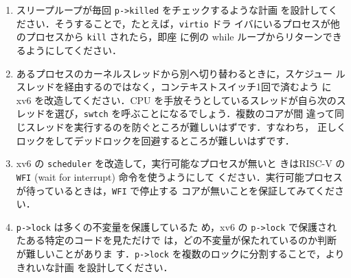 \begin{enumerate}
\item スリープループが毎回 \texttt{p->killed} をチェックするような計画
  を設計してください．そうすることで，たとえば，\texttt{virtio} ドラ
  イバにいるプロセスが他のプロセスから \texttt{kill} されたら，即座
  に例の while ループからリターンできるようにしてください．

\item あるプロセスのカーネルスレッドから別へ切り替わるときに，スケジュー
  ルスレッドを経由するのではなく，コンテキストスイッチ1回で済むよう
  に xv6 を改造してください．CPU を手放そうとしているスレッドが自ら次のス
  レッドを選び，\texttt{swtch} を呼ぶことになるでしょう．複数のコアが間
  違って同じスレッドを実行するのを防ぐところが難しいはずです．すなわち，
  正しくロックをしてデッドロックを回避するところが難しいはずです．

\item xv6 の \texttt{scheduler} を改造して，実行可能なプロセスが無いと
  きはRISC-V の \texttt{WFI} (wait for interrupt) 命令を使うようにして
  ください．実行可能プロセスが待っているときは，\texttt{WFI} で停止する
  コアが無いことを保証してみてください．

\item \texttt{p->lock} は多くの不変量を保護しているた
  め，xv6 の \texttt{p->lock} で保護されたある特定のコードを見ただけで
  は，どの不変量が保たれているのか判断が難しいことがありま
  す．\texttt{p->lock} を複数のロックに分割することで，よりきれいな計画
  を設計してください．

\end{enumerate}

